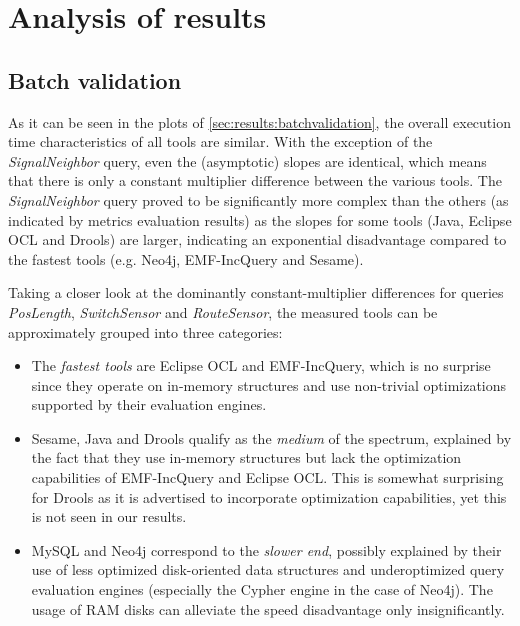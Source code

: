 \section{Analysis of results}


\subsection{Batch validation}

% 

As it can be seen in the plots of \autoref{sec:results:batchvalidation}, the overall execution time characteristics of all tools are similar. With the exception of the \emph{SignalNeighbor} query, even the (asymptotic) slopes are identical, which means that there is only a constant multiplier difference between the various tools. The \emph{SignalNeighbor} query proved to be significantly more complex than the others (as indicated by metrics evaluation results) as the slopes for some tools (Java, Eclipse OCL and Drools) are larger, indicating an exponential disadvantage compared to the fastest tools (e.g. Neo4j, EMF-IncQuery and Sesame).

Taking a closer look at the dominantly constant-multiplier differences for queries \emph{PosLength}, \emph{SwitchSensor} and \emph{RouteSensor}, the measured tools can be approximately grouped into three categories:
\begin{itemize}
  \item The \emph{fastest tools} are Eclipse OCL and EMF-IncQuery, which is no surprise since they operate on in-memory structures and use non-trivial optimizations supported by their evaluation engines.
  \item Sesame, Java and Drools qualify as the \emph{medium} of the spectrum, explained by the fact that they use in-memory structures but lack the optimization capabilities of EMF-IncQuery and Eclipse OCL. This is somewhat surprising for Drools as it is advertised to incorporate optimization capabilities, yet this is not seen in our results.
  \item MySQL and Neo4j correspond to the \emph{slower end}, possibly explained by their use of less optimized disk-oriented data structures and underoptimized query evaluation engines (especially the Cypher engine in the case of Neo4j). The usage of RAM disks can alleviate the speed disadvantage only insignificantly.
\end{itemize}

